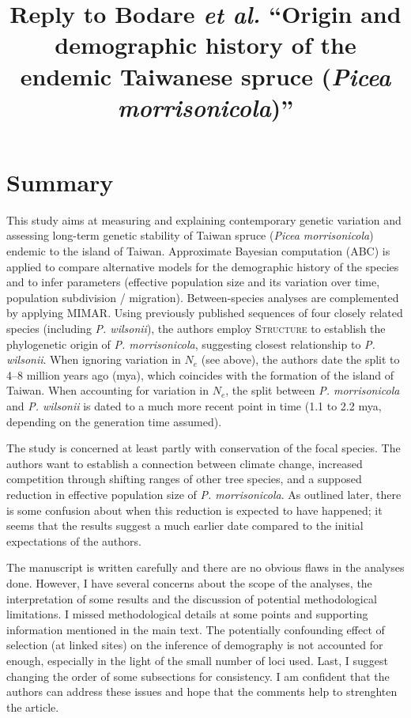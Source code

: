 \documentclass[11pt]{article}
\title{Reply to Bodare \emph{et al.} ``Origin and demographic history of the endemic Taiwanese spruce (\emph{Picea morrisonicola})''}
\begin{document}
\maketitle

\section{Summary}
This study aims at measuring and explaining contemporary genetic variation and assessing long-term genetic stability of Taiwan spruce (\emph{Picea morrisonicola}) endemic to the island of Taiwan. Approximate Bayesian computation (ABC) is applied to compare alternative models for the demographic history of the species and to infer parameters (effective population size and its variation over time, population subdivision / migration). Between-species analyses are complemented by applying MIMAR. Using previously published sequences of four closely related species (including \emph{P. wilsonii}), the authors employ \textsc{Structure} to establish the phylogenetic origin of \emph{P. morrisonicola}, suggesting closest relationship to \emph{P. wilsonii}. When ignoring variation in $N_{e}$ (see above), the authors date the split to 4--8 million years ago (mya), which coincides with the formation of the island of Taiwan. When accounting for variation in $N_e$, the split between \emph{P. morrisonicola} and \emph{P. wilsonii} is dated to a much more recent point in time (1.1 to 2.2 mya, depending on the generation time assumed).

The study is concerned at least partly with conservation of the focal species. The authors want to establish a connection between climate change, increased competition through shifting ranges of other tree species, and a supposed reduction in effective population size of \emph{P. morrisonicola}. As outlined later, there is some confusion about when this reduction is expected to have happened; it seems that the results suggest a much earlier date compared to the initial expectations of the authors.

The manuscript is written carefully and there are no obvious flaws in the analyses done. However, I have several concerns about the scope of the analyses, the interpretation of some results and the discussion of potential methodological limitations. I missed methodological details at some points and supporting information mentioned in the main text. The potentially confounding effect of selection (at linked sites) on the inference of demography is not accounted for enough, especially in the light of the small number of loci used. Last, I suggest changing the order of some subsections for consistency. I am confident that the authors can address these issues and hope that the comments help to strenghten the article.
\end{document}
